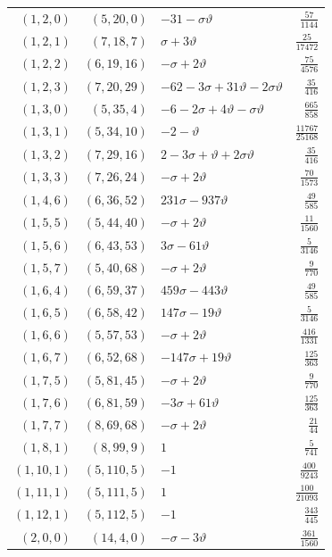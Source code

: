 \begin{longtable}{rrlr}
$(1,2,0)$ & $(5,20,0)$ & $-31-\sigma\vartheta$ & $\frac{57}{1144}$\\
$(1,2,1)$ & $(7,18,7)$ & $\sigma+3\vartheta$ & $\frac{25}{17472}$\\
$(1,2,2)$ & $(6,19,16)$ & $-\sigma+2\vartheta$ & $\frac{75}{4576}$\\
$(1,2,3)$ & $(7,20,29)$ & $-62-3\sigma+31\vartheta-2\sigma\vartheta$ & $\frac{35}{416}$\\
$(1,3,0)$ & $(5,35,4)$ & $-6-2\sigma+4\vartheta-\sigma\vartheta$ & $\frac{665}{858}$\\
$(1,3,1)$ & $(5,34,10)$ & $-2-\vartheta$ & $\frac{11767}{25168}$\\
$(1,3,2)$ & $(7,29,16)$ & $2-3\sigma+\vartheta+2\sigma\vartheta$ & $\frac{35}{416}$\\
$(1,3,3)$ & $(7,26,24)$ & $-\sigma+2\vartheta$ & $\frac{70}{1573}$\\
$(1,4,6)$ & $(6,36,52)$ & $231\sigma-937\vartheta$ & $\frac{49}{585}$\\
$(1,5,5)$ & $(5,44,40)$ & $-\sigma+2\vartheta$ & $\frac{11}{1560}$\\
$(1,5,6)$ & $(6,43,53)$ & $3\sigma-61\vartheta$ & $\frac{5}{3146}$\\
$(1,5,7)$ & $(5,40,68)$ & $-\sigma+2\vartheta$ & $\frac{9}{770}$\\
$(1,6,4)$ & $(6,59,37)$ & $459\sigma-443\vartheta$ & $\frac{49}{585}$\\
$(1,6,5)$ & $(6,58,42)$ & $147\sigma-19\vartheta$ & $\frac{5}{3146}$\\
$(1,6,6)$ & $(5,57,53)$ & $-\sigma+2\vartheta$ & $\frac{416}{1331}$\\
$(1,6,7)$ & $(6,52,68)$ & $-147\sigma+19\vartheta$ & $\frac{125}{363}$\\
$(1,7,5)$ & $(5,81,45)$ & $-\sigma+2\vartheta$ & $\frac{9}{770}$\\
$(1,7,6)$ & $(6,81,59)$ & $-3\sigma+61\vartheta$ & $\frac{125}{363}$\\
$(1,7,7)$ & $(8,69,68)$ & $-\sigma+2\vartheta$ & $\frac{21}{44}$\\
$(1,8,1)$ & $(8,99,9)$ & $1$ & $\frac{5}{741}$\\
$(1,10,1)$ & $(5,110,5)$ & $-1$ & $\frac{400}{9243}$\\
$(1,11,1)$ & $(5,111,5)$ & $1$ & $\frac{100}{21093}$\\
$(1,12,1)$ & $(5,112,5)$ & $-1$ & $\frac{343}{445}$\\
$(2,0,0)$ & $(14,4,0)$ & $-\sigma-3\vartheta$ & $\frac{361}{1560}$\\

\end{longtable}
